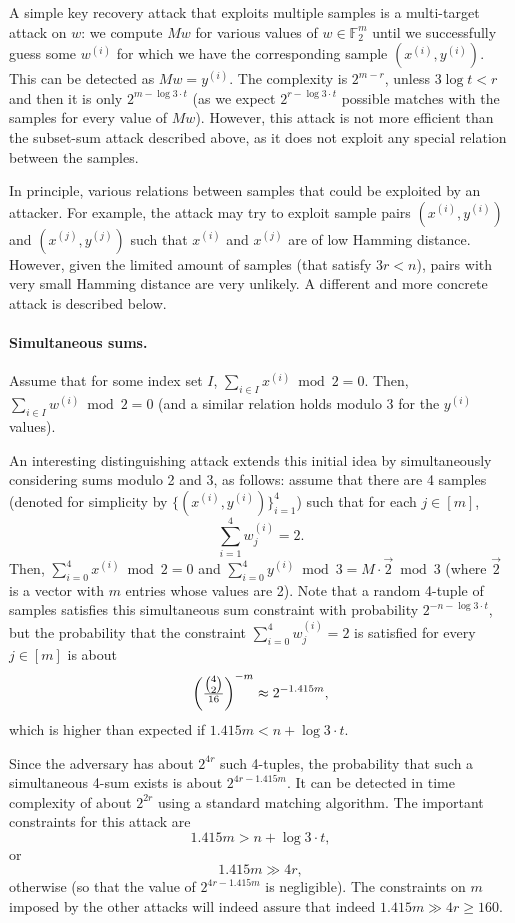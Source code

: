 \documentclass{article}
\begin{document}
A simple key recovery attack that exploits multiple samples is a multi-target attack on $w$: we compute $M w$ for various values of $w \in \mathbb{F}_2^m$ until we successfully guess some $w^{(i)}$ for which we have the corresponding sample $(x^{(i)},y^{(i)})$. This can be detected as $M w = y^{(i)}$. The complexity is $2^{m - r}$, unless $3 \log t < r$ and then it is only $2^{m - \log 3 \cdot t}$ (as we expect $2^{r - \log 3 \cdot t}$ possible matches with the samples for every value of $M w$). However, this attack is not more efficient than the subset-sum attack described above, as it does not exploit any special relation between the samples.

In principle, various relations between samples that could be exploited by an attacker. For example, the attack may try to exploit sample pairs $(x^{(i)},y^{(i)})$ and $(x^{(j)},y^{(j)})$ such that $x^{(i)}$ and $x^{(j)}$ are of low Hamming distance. However, given the limited amount of samples (that satisfy $3r < n $), pairs with very small Hamming distance are very unlikely. A different and more concrete attack is described below.


\paragraph{Simultaneous sums.}
Assume that for some index set $I$, $\sum_{i \in I} x^{(i)} \bmod 2 = 0$. Then, $\sum_{i \in I} w^{(i)} \bmod 2 = 0$ (and a similar relation holds modulo 3 for the $y^{(i)}$ values).

An interesting distinguishing attack extends this initial idea by simultaneously considering sums modulo 2 and 3, as follows: assume that there are 4 samples (denoted for simplicity
by $ \{(x^{(i)},y^{(i)})\}_{i=1}^{4}$) such that for each $j \in [m]$, $$\sum_{i = 1}^{4} w^{(i)}_j = 2.$$
Then, $\sum_{i = 0}^{4} x^{(i)} \bmod 2 = 0$ and $\sum_{i = 0}^{4} y^{(i)} \bmod 3 = M \cdot \vec{2} \bmod 3$ (where $\vec{2}$ is a vector with $m$ entries whose values are 2).
Note that a random 4-tuple of samples satisfies this simultaneous sum constraint with probability
$2^{-n - \log 3 \cdot t}$, but the probability that the constraint $\sum_{i = 0}^{4} w^{(i)}_j = 2$ is satisfied for every $j \in [m]$ is about
$$\left( \tfrac{\tbinom{4}{2}}{16} \right) ^{-m} \approx 2^{- 1.415 m},$$
which is higher than expected if $1.415 m < n + \log 3 \cdot t $.

Since the adversary has about $2^{4r}$ such 4-tuples, the probability that such a simultaneous 4-sum exists is about $2^{4r - 1.415 m}$. It can be detected in time complexity of about $2^{2r}$ using a standard matching algorithm. The important constraints for this attack are
$$1.415 m > n + \log 3 \cdot t,$$ or
$$1.415 m \gg 4r,$$
otherwise (so that the value of $2^{4r - 1.415 m}$ is negligible).
The constraints on $m$ imposed by the other attacks will indeed assure that
indeed $1.415 m \gg 4r \geq 160$.
\end{document}
